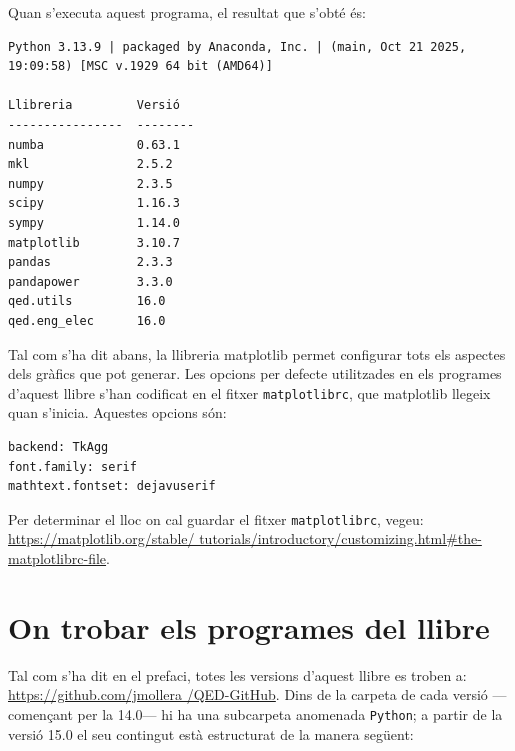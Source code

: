 Quan s'executa aquest programa, el resultat que s'obté és:
\lstset{
	language=,
	numbers=none,
	frame=none
}

\begin{lstlisting}
Python 3.13.9 | packaged by Anaconda, Inc. | (main, Oct 21 2025, 19:09:58) [MSC v.1929 64 bit (AMD64)]

Llibreria         Versió
----------------  --------
numba             0.63.1
mkl               2.5.2
numpy             2.3.5
scipy             1.16.3
sympy             1.14.0
matplotlib        3.10.7
pandas            2.3.3
pandapower        3.3.0
qed.utils         16.0
qed.eng_elec      16.0
\end{lstlisting} 


Tal com s'ha dit abans, la llibreria matplotlib permet configurar tots els aspectes dels gràfics que pot generar. Les opcions per defecte utilitzades en els programes d'aquest llibre s'han codificat en el fitxer \texttt{matplotlibrc}, que matplotlib llegeix quan s'inicia. Aquestes opcions són:
\begin{lstlisting}
backend: TkAgg
font.family: serif
mathtext.fontset: dejavuserif
\end{lstlisting} 

Per determinar el lloc on cal guardar el fitxer \texttt{matplotlibrc}, vegeu: \href{https://matplotlib.org/stable/tutorials/introductory/customizing.html#the-matplotlibrc-file}{https:/\!\!/matplotlib.org/stable/ tutorials/introductory/customizing.html\#the-matplotlibrc-file}.



\section{On trobar els programes del llibre}\label{sec:progs-llibre-internet}

Tal com s'ha dit en el prefaci, totes les versions d'aquest llibre es troben a:
\href{https://github.com/jmollera/QED-GitHub}{https:/\!\!/github.com/jmollera
/QED-GitHub}.  Dins de la carpeta de cada versió ---començant per la 14.0--- hi ha una subcarpeta anomenada \texttt{Python}; a partir de la versió 15.0  el seu contingut està estructurat de la manera següent: 
 
